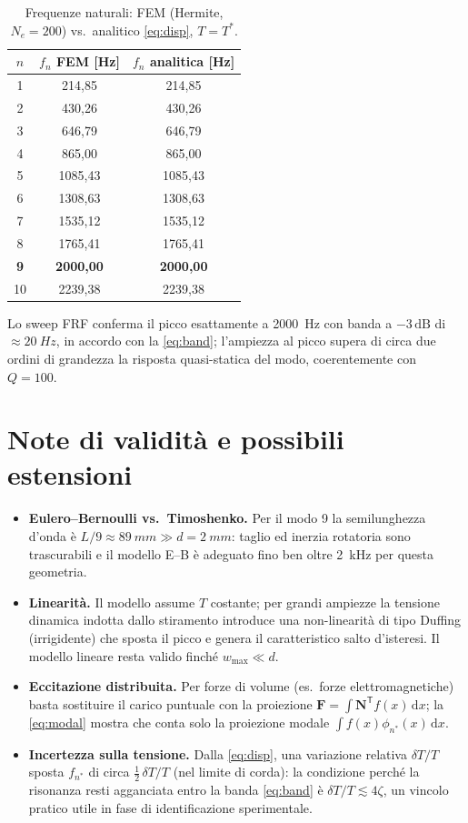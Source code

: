 \documentclass[11pt,a4paper]{article}
\begin{document}
\begin{table}[ht]
\centering
\caption{Frequenze naturali: FEM (Hermite, $N_e=200$) vs.\ analitico
\eqref{eq:disp}, $T = T^\ast$.}
\label{tab:modi}
\begin{tabular}{ccc}
\toprule
$n$ & $f_n$ FEM [\si{Hz}] & $f_n$ analitica [\si{Hz}]\\
\midrule
1 & 214{,}85 & 214{,}85\\
2 & 430{,}26 & 430{,}26\\
3 & 646{,}79 & 646{,}79\\
4 & 865{,}00 & 865{,}00\\
5 & 1085{,}43 & 1085{,}43\\
6 & 1308{,}63 & 1308{,}63\\
7 & 1535{,}12 & 1535{,}12\\
8 & 1765{,}41 & 1765{,}41\\
\textbf{9} & \textbf{2000{,}00} & \textbf{2000{,}00}\\
10 & 2239{,}38 & 2239{,}38\\
\bottomrule
\end{tabular}
\end{table}

Lo sweep FRF conferma il picco esattamente a \SI{2000}{Hz} con banda a
$-3\,\mathrm{dB}$ di $\approx \SI{20}{Hz}$, in accordo con la
\eqref{eq:band}; l'ampiezza al picco supera di circa due ordini di grandezza
la risposta quasi-statica del modo, coerentemente con $Q = 100$.

\section{Note di validit\`a e possibili estensioni}
\begin{itemize}
\item \textbf{Eulero--Bernoulli vs.\ Timoshenko.} Per il modo 9 la
semilunghezza d'onda \`e $L/9 \approx \SI{89}{mm} \gg d = \SI{2}{mm}$:
taglio ed inerzia rotatoria sono trascurabili e il modello E--B \`e adeguato
fino ben oltre \SI{2}{kHz} per questa geometria.
\item \textbf{Linearit\`a.} Il modello assume $T$ costante; per grandi
ampiezze la tensione dinamica indotta dallo stiramento introduce una
non-linearit\`a di tipo Duffing (irrigidente) che sposta il picco e genera il
caratteristico salto d'isteresi. Il modello lineare resta valido finch\'e
$w_{\max} \ll d$.
\item \textbf{Eccitazione distribuita.} Per forze di volume (es.\ forze
elettromagnetiche) basta sostituire il carico puntuale con la proiezione
$\bm{F} = \int \bm{N}^{\mathsf T} f(x)\,\mathrm{d}x$; la
\eqref{eq:modal} mostra che conta solo la proiezione modale
$\int f(x)\phi_{n^\ast}(x)\,\mathrm{d}x$.
\item \textbf{Incertezza sulla tensione.} Dalla \eqref{eq:disp}, una
variazione relativa $\delta T/T$ sposta $f_{n^\ast}$ di circa
$\tfrac{1}{2}\,\delta T/T$ (nel limite di corda): la condizione perch\'e la
risonanza resti agganciata entro la banda \eqref{eq:band} \`e
$\delta T/T \lesssim 4\zeta$, un vincolo pratico utile in fase di
identificazione sperimentale.
\end{itemize}
\end{document}
